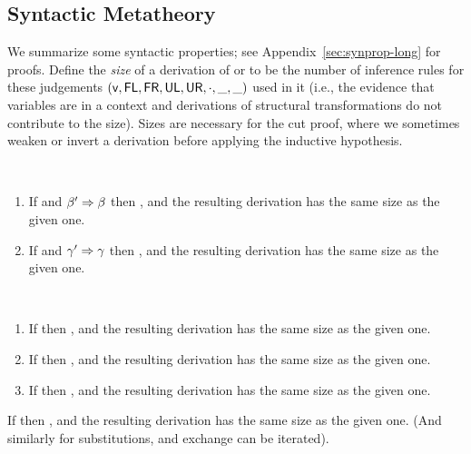 \subsection{Syntactic Metatheory}
\label{sec:synprop-short}

We summarize some syntactic properties; see
Appendix~\ref{sec:synprop-long} for proofs.  Define the \emph{size} of a
derivation of  or \seq{\Gamma}{\gamma}{\Delta} to
be the number of inference rules for these judgements $(\mathsf{v},\mathsf{FL},
\mathsf{FR}, \mathsf{UL}, \mathsf{UR}, \cdot, \_,\_)$ used in it (i.e., the evidence that
variables are in a context and derivations of structural transformations
do not contribute to the size).  Sizes are necessary for the cut proof,
where we sometimes weaken or invert a derivation before applying the
inductive hypothesis.

\begin{lemma} ~ \label{lem:respectspr}
\begin{enumerate}
\item If  and $\beta' \Rightarrow \beta$ then
  , and the resulting derivation has the same
  size as the given one.
\item If \seq{\Gamma}{\gamma}{\Delta} and $\gamma' \Rightarrow \gamma$ then
  , and the resulting derivation has the
  same size as the given one.
\end{enumerate}
\end{lemma}

\begin{lemma} \label{lem:weakening} ~
\begin{enumerate}
\item If  then
, and the resulting
derivation has the same size as the given one.  
\item If  then
, and the resulting
derivation has the same size as the given one.  
\item If  then
, and the resulting
derivation has the same size as the given one.  
\end{enumerate}
\end{lemma}

\begin{lemma} \label{lem:exchange}
If  then
, and the resulting derivation
has the same size as the given one.  (And similarly for substitutions,
and exchange can be iterated).  
\end{lemma}

